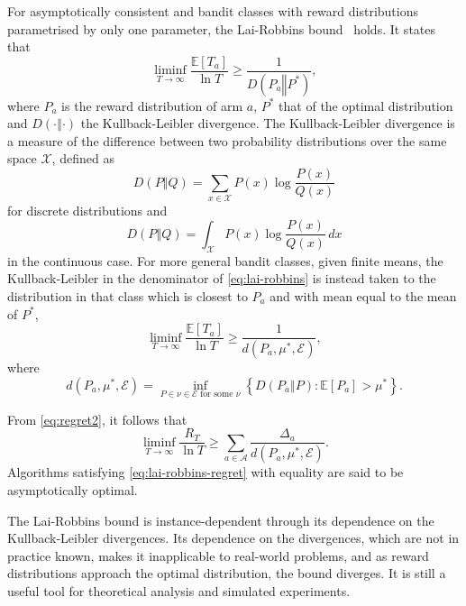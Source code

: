 For asymptotically consistent and bandit classes with reward distributions parametrised by only one parameter, the Lai-Robbins bound~\autocite{lai1985} holds.
It states that
\begin{equation}
    \liminf_{T\to\infty} \frac{\mathbb{E}[T_a]}{\ln T} \geq \frac{1}{D(P_a \mathrel{\Vert} P^*)},
    \label{eq:lai-robbins-times}
\end{equation}
where $P_a$ is the reward distribution of arm $a$, $P^*$ that of the optimal distribution and $D(\cdot \mathrel{\Vert} \cdot)$ the Kullback-Leibler divergence.
The Kullback-Leibler divergence is a measure of the difference between two probability distributions over the same space $\mathcal{X}$, defined as
\begin{equation}
    D(P \mathrel{\Vert} Q) = \sum_{x \in \mathcal{X}} P(x) \log \frac{P(x)}{Q(x)}
\end{equation}
for discrete distributions and
\begin{equation}
    D(P \mathrel{\Vert} Q) = \int_{\mathcal{X}} P(x) \log \frac{P(x)}{Q(x)} \, dx
\end{equation}
in the continuous case.
For more general bandit classes, given finite means, the Kullback-Leibler in the denominator of \cref{eq:lai-robbins} is instead taken to the distribution in that class which is closest to $P_a$ and with mean equal to the mean of $P^*$,
\begin{equation}
    \liminf_{T\to\infty} \frac{\mathbb{E}[T_a]}{\ln T} \geq \frac{1}{d(P_a, \mu^*, \mathcal{E})},
    \label{eq:lai-robbins}
\end{equation}
where
\begin{equation}
    d(P_a, \mu^*, \mathcal{E}) =
    \inf_{P \in \nu \in \mathcal{E} \text{ for some } \nu}
    \left\{ D(P_a \mathrel{\Vert} P): \mathbb{E}[P_a] > \mu^* \right\}.
\end{equation}


From \cref{eq:regret2}, it follows that
\begin{equation}
    \liminf_{T\to\infty} \frac{R_T}{\ln T}
    \geq
    \sum_{a \in \mathcal{A}}\frac{\Delta_a}{d(P_a, \mu^*, \mathcal{E})}.
    \label{eq:lai-robbins-regret}
\end{equation}
Algorithms satisfying \cref{eq:lai-robbins-regret} with equality are said to be asymptotically optimal.

The Lai-Robbins bound is instance-dependent through its dependence on the Kullback-Leibler divergences.
Its dependence on the divergences, which are not in practice known, makes it inapplicable to real-world problems,
and as reward distributions approach the optimal distribution, the bound diverges.
It is still a useful tool for theoretical analysis and simulated experiments.


